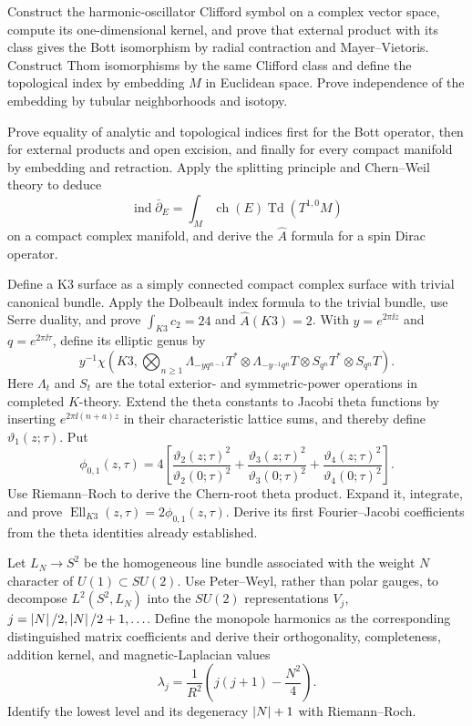 \begin{exercise}
Construct the harmonic-oscillator Clifford symbol on a complex vector space,
compute its one-dimensional kernel, and prove that external product with its
class gives the Bott isomorphism by radial contraction and Mayer--Vietoris.
Construct Thom isomorphisms by the same Clifford class and define the
topological index by embedding $M$ in Euclidean space.  Prove independence of
the embedding by tubular neighborhoods and isotopy.
\end{exercise}

\begin{exercise}
Prove equality of analytic and topological indices first for the Bott
operator, then for external products and open excision, and finally for every
compact manifold by embedding and retraction.  Apply the splitting principle
and Chern--Weil theory to deduce
\[
 \operatorname{ind}\bar\partial_E
 =\int_M\operatorname{ch}(E)\operatorname{Td}(T^{1,0}M)
\]
on a compact complex manifold, and derive the $\widehat A$ formula for a
spin Dirac operator.
\end{exercise}

\begin{exercise}
Define a K3 surface as a simply connected compact complex surface with
trivial canonical bundle.  Apply the Dolbeault index formula to the trivial
bundle, use Serre duality, and prove $\int_{K3}c_2=24$ and
$\widehat A(K3)=2$.  With
$y=e^{2\pi\ii z}$ and $q=e^{2\pi\ii\tau}$, define its elliptic genus by
\[
 y^{-1}\chi\!\left(K3,\bigotimes_{n\ge1}
 \Lambda_{-yq^{n-1}}T^*\otimes\Lambda_{-y^{-1}q^n}T
 \otimes S_{q^n}T^*\otimes S_{q^n}T\right).
\]
Here $\Lambda_t$ and $S_t$ are the total exterior- and symmetric-power
operations in completed $K$-theory.
Extend the theta constants to Jacobi theta functions by inserting
$e^{2\pi\ii(n+a)z}$ in their characteristic lattice sums, and thereby define
$\vartheta_1(z;\tau)$.  Put
\[
 \phi_{0,1}(z,\tau)=4\left[
 \frac{\vartheta_2(z;\tau)^2}{\vartheta_2(0;\tau)^2}
 +\frac{\vartheta_3(z;\tau)^2}{\vartheta_3(0;\tau)^2}
 +\frac{\vartheta_4(z;\tau)^2}{\vartheta_4(0;\tau)^2}\right].
\]
Use Riemann--Roch to derive the Chern-root theta product.  Expand it,
integrate, and prove
$\operatorname{Ell}_{K3}(z,\tau)=2\phi_{0,1}(z,\tau)$.  Derive its first
Fourier--Jacobi coefficients from the theta identities already established.
\end{exercise}

\begin{exercise}
Let $L_N\to S^2$ be the homogeneous line bundle associated with the weight
$N$ character of $U(1)\subset SU(2)$.  Use Peter--Weyl, rather than polar
gauges, to decompose $L^2(S^2,L_N)$ into the $SU(2)$ representations
$V_j$, $j=\left\lvert N\right\rvert/2,\left\lvert N\right\rvert/2+1,\ldots$.  Define the monopole harmonics as the
corresponding distinguished matrix coefficients and derive their
orthogonality, completeness, addition kernel, and magnetic-Laplacian values
\[
 \lambda_j=\frac1{R^2}\left(j(j+1)-\frac{N^2}{4}\right).
\]
Identify the lowest level and its degeneracy $\left\lvert N\right\rvert+1$ with Riemann--Roch.
\end{exercise}

